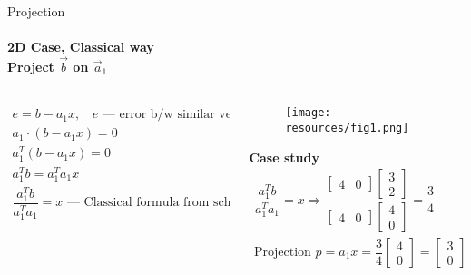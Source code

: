 \documentclass[aspectratio=169]{beamer}
\begin{document}
\begin{frame}[t]{Projection}
    \framesubtitle{2D Case, Classical way \\ Project $\vec{b}$ on $\vec{a}_1$}
    \vspace{-0.8cm}
    \begin{columns}[T,onlytextwidth]
        \begin{column}{0.49\textwidth}
            \begin{align*}
                e = b -a_1x,\ \text{ $e$ --- error b/w similar vectors} \\
                a_1 \cdot (b-a_1x)=0 \\
                a_1^T(b-a_1x)=0 \\
                a_1^Tb = a_1^Ta_1x \\
                \dfrac{a_1^Tb}{a_1^Ta_1} = x \text{ --- Classical formula from school}
                \end{align*}
        \end{column}
        \begin{column}{0.49\textwidth}
            \vspace{-1.8cm}
            \begin{figure}[H]
                \centering\texttt{[image: resources/fig1.png]}
                \label{fig:resources/fig1.png}
            \end{figure}
            \vspace{-1cm}
            \textbf{Case study}
            \begin{align*}
            \dfrac{a_1^Tb}{a_1^Ta_1} = x \Rightarrow
            \dfrac{\begin{bmatrix}4&0\end{bmatrix}\begin{bmatrix}3\\2\end{bmatrix}}{\begin{bmatrix}4&0\end{bmatrix}\begin{bmatrix}4\\0\end{bmatrix}}=\dfrac{3}{4} \\
            \text{Projection } p=a_1x = \dfrac{3}{4} \begin{bmatrix}4\\0\end{bmatrix} = \begin{bmatrix}3\\0\end{bmatrix}
            \end{align*}
        \end{column}
    \end{columns}
\end{frame}
\end{document}
